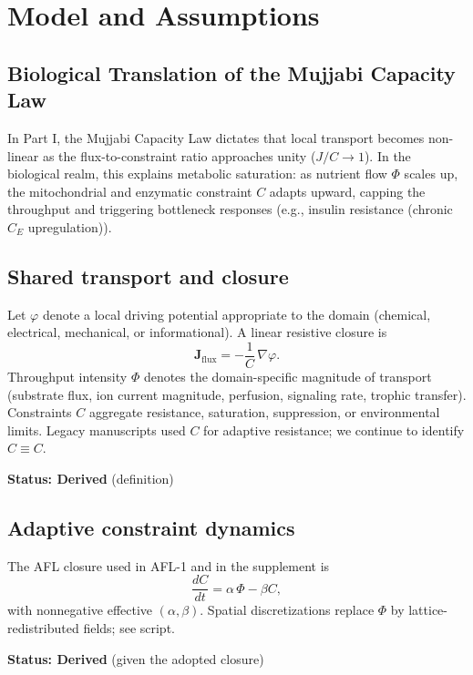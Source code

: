 \documentclass[11pt]{article}
\begin{document}
\section{Model and Assumptions}

\subsection{Biological Translation of the Mujjabi Capacity Law \cite{MujjabiPartI2026}}
In Part I, the Mujjabi Capacity Law \cite{MujjabiPartI2026} dictates that local transport becomes non-linear as the flux-to-constraint ratio approaches unity ($J/C \to 1$). In the biological realm, this explains metabolic saturation: as nutrient flow $\Phi$ scales up, the mitochondrial and enzymatic constraint $C$ adapts upward, capping the throughput and triggering bottleneck responses (e.g., insulin resistance (chronic $C_E$ upregulation)).


\subsection{Shared transport and closure}
Let $\varphi$ denote a local driving potential appropriate to the domain (chemical, electrical, mechanical, or informational). A linear resistive closure is
\begin{equation}
  \mathbf{J}_{\mathrm{flux}} = -\frac{1}{C}\,\nabla \varphi .
\end{equation}
Throughput intensity $\Phi$ denotes the domain-specific magnitude of transport (substrate flux, ion current magnitude, perfusion, signaling rate, trophic transfer). Constraints $C$ aggregate resistance, saturation, suppression, or environmental limits. Legacy manuscripts used $C$ for adaptive resistance; we continue to identify $C\equiv C$.

\textbf{Status: Derived} (definition)

\subsection{Adaptive constraint dynamics}
The AFL closure used in AFL-1 and in the supplement is
\begin{equation}
  \frac{dC}{dt} = \alpha\,\Phi - \beta C,
  \label{eq:afl2closure}
\end{equation}
with nonnegative effective $(\alpha,\beta)$. Spatial discretizations replace $\Phi$ by lattice-redistributed fields; see script.

\textbf{Status: Derived} (given the adopted closure)
\end{document}
